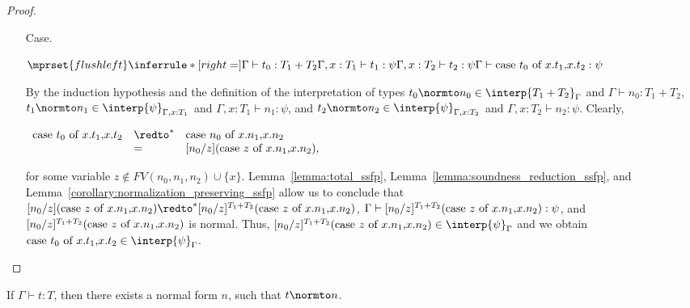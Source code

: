 \begin{proof}
\begin{itemize}
\item[Case.]\ \\
  \begin{center}
    \begin{math}
      $$\mprset{flushleft}
      \inferrule* [right=] {
        \Gamma \vdash t_0:T_1 + T_2
        \\
	\Gamma,x:T_1 \vdash t_1:\psi
        \\
	\Gamma,x:T_2 \vdash t_2:\psi
      }{\Gamma \vdash \ccon{t_0}{x}{t_1}{t_2}: \psi}
    \end{math}
  \end{center}
  By the induction hypothesis and the definition of the interpretation of types
  $t_0 \normto n_0 \in \interp{T_1 + T_2}_\Gamma$ and $\Gamma \vdash n_0:T_1+T_2$, 
  $t_1 \normto n_1 \in \interp{\psi}_{\Gamma,x:T_1}$ and $\Gamma,x:T_1 \vdash n_1:\psi$, and
  $t_2 \normto n_2 \in \interp{\psi}_{\Gamma,x:T_2}$ and  $\Gamma,x:T_2 \vdash n_2:\psi$.  
  Clearly, 
  \begin{center}
    \begin{math}
      \begin{array}{lll}
        \ccon{t_0}{x}{t_1}{t_2} & \redto^* & \ccon{n_0}{x}{n_1}{n_2}\\
        & =        & [n_0/z](\ccon{z}{x}{n_1}{n_2}),
      \end{array}
    \end{math}
  \end{center}
  for some variable $z \not \in FV(n_0,n_1,n_2) \cup \{x\}$.  Lemma~\ref{lemma:total_ssfp}, 
  Lemma~\ref{lemma:soundness_reduction_ssfp}, and Lemma~\ref{corollary:normalization_preserving_ssfp} 
  allow us to conclude that $[n_0/z](\ccon{z}{x}{n_1}{n_2}) \redto^* [n_0/z]^{T_1+T_2}(\ccon{z}{x}{n_1}{n_2})$,
  $\Gamma \vdash [n_0/z]^{T_1+T_2}(\mbox{case}\ z\ \text{of}\ x\text{.}n_1\text{,}x\text{.}n_2) :\psi$, and $[n_0/z]^{T_1+T_2}(\mbox{case}\ z\ \text{of}\ x\text{.}n_1\text{,}x\text{.}n_2)$
  is normal.  Thus, $[n_0/z]^{T_1+T_2}(\ccon{z}{x}{n_1}{n_2}) \in \interp{\psi}_\Gamma$ and we obtain 
  $\ccon{t_0}{x}{t_1}{t_2} \in \interp{\psi}_\Gamma$. 
\end{itemize}
\end{proof}

\begin{corollary}[Normalization]
  If $\Gamma \vdash t:T$, then there exists a normal form $n$, such
  that $t \normto n$.
\end{corollary}

